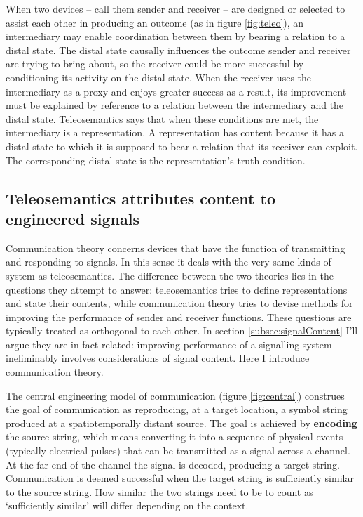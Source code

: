 \documentclass[12pt]{article}
\begin{document}
When two devices -- call them sender and receiver -- are designed or selected to assist each other in producing an outcome (as in figure \ref{fig:teleo}), an intermediary may enable coordination between them by bearing a relation to a distal state.
The distal state causally influences the outcome sender and receiver are trying to bring about, so the receiver could be more successful by conditioning its activity on the distal state.
When the receiver uses the intermediary as a proxy and enjoys greater success as a result, its improvement must be explained by reference to a relation between the intermediary and the distal state.
Teleosemantics says that when these conditions are met, the intermediary is a representation.
A representation has content because it has a distal state to which it is supposed to bear a relation that its receiver can exploit.
The corresponding distal state is the representation's truth condition.


\subsection{Teleosemantics attributes content to engineered signals}

Communication theory concerns devices that have the function of transmitting and responding to signals.
In this sense it deals with the very same kinds of system as teleosemantics.
The difference between the two theories lies in the questions they attempt to answer: teleosemantics tries to define representations and state their contents, while communication theory tries to devise methods for improving the performance of sender and receiver functions.
These questions are typically treated as orthogonal to each other.
In section \ref{subsec:signalContent} I'll argue they are in fact related: improving performance of a signalling system ineliminably involves considerations of signal content.
Here I introduce communication theory.

The central engineering model of communication (figure \ref{fig:central}) construes the goal of communication as reproducing, at a target location, a symbol string produced at a spatiotemporally distant source.
The goal is achieved by \textbf{encoding} the source string, which means converting it into a sequence of physical events (typically electrical pulses) that can be transmitted as a signal across a channel.
At the far end of the channel the signal is decoded, producing a target string.
Communication is deemed successful when the target string is sufficiently similar to the source string.
How similar the two strings need to be to count as `sufficiently similar' will differ depending on the context.
\end{document}
